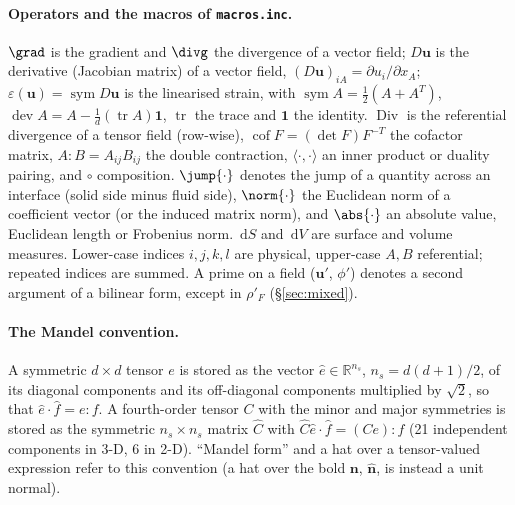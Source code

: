 \documentclass[11pt]{article}
\numberwithin{equation}{section}
\theoremstyle{remark}
\newcommand{\R}{\mathbb{R}}
\newcommand{\eps}{\varepsilon}
\newcommand{\dS}{\,\mathrm{d}S}
\newcommand{\dV}{\,\mathrm{d}V}
\newcommand{\tr}{\operatorname{tr}}
\newcommand{\cof}{\operatorname{cof}}
\newcommand{\Div}{\operatorname{Div}}
\newcommand{\sym}{\operatorname{sym}}
\newcommand{\dev}{\operatorname{dev}}
\newcommand{\vu}{\mathbf{u}}
\newcommand{\vn}{\hat{\mathbf{n}}}
\newcommand{\code}[1]{\texttt{#1}}
\begin{document}
\paragraph{Operators and the macros of \code{macros.inc}.} $\grad$ is the
gradient and $\divg$ the divergence of a vector field; $D\vu$ is the
derivative (Jacobian matrix) of a vector field, $(D\vu)_{iA} = \partial
u_i/\partial x_A$; $\eps(\vu) = \sym D\vu$ is the linearised strain, with
$\sym A = \frac12(A + A^T)$, $\dev A = A - \frac1d(\tr A)\mathbf{1}$, $\tr$
the trace and $\mathbf{1}$ the identity. $\Div$ is the referential
divergence of a tensor field (row-wise), $\cof F = (\det F)F^{-T}$ the
cofactor matrix, $A:B = A_{ij}B_{ij}$ the double contraction,
$\langle\cdot,\cdot\rangle$ an inner product or duality pairing, and
$\circ$ composition. $\jump{\cdot}$ denotes the jump of a quantity across
an interface (solid side minus fluid side), $\norm{\cdot}$ the Euclidean
norm of a coefficient vector (or the induced matrix norm), and
$\abs{\cdot}$ an absolute value, Euclidean length or Frobenius norm.
$\dS$ and $\dV$ are surface and volume measures. Lower-case indices
$i,j,k,l$ are physical, upper-case $A,B$ referential; repeated indices are
summed. A prime on a field ($\vu'$, $\phi'$) denotes a second argument of a
bilinear form, except in $\rho'_F$ (\S\ref{sec:mixed}).

\paragraph{The Mandel convention.} A symmetric $d\times d$ tensor $e$ is
stored as the vector $\hat e\in\R^{n_s}$, $n_s = d(d+1)/2$, of its diagonal
components and its off-diagonal components multiplied by $\sqrt2$, so that
$\hat e\cdot\hat f = e:f$. A fourth-order tensor $C$ with the minor and
major symmetries is stored as the symmetric $n_s\times n_s$ matrix $\hat C$
with $\hat C\hat e\cdot\hat f = (Ce):f$ (21 independent components in 3-D,
6 in 2-D). ``Mandel form'' and a hat over a tensor-valued expression refer
to this convention (a hat over the bold $\mathbf{n}$, $\vn$, is instead a
unit normal).
\end{document}

